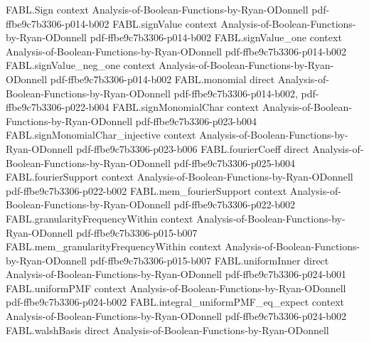 \begin{theorem}
\label{FABL.FiniteFourierBasis.productFunction_dependsOnly_support}
\leanok
{}
\proofstep
  {FABL.Sign}
  {context}
  {Analysis-of-Boolean-Functions-by-Ryan-ODonnell}
  {pdf-ffbe9c7b3306-p014-b002}
\proofstep
  {FABL.signValue}
  {context}
  {Analysis-of-Boolean-Functions-by-Ryan-ODonnell}
  {pdf-ffbe9c7b3306-p014-b002}
\proofstep
  {FABL.signValue_one}
  {context}
  {Analysis-of-Boolean-Functions-by-Ryan-ODonnell}
  {pdf-ffbe9c7b3306-p014-b002}
\proofstep
  {FABL.signValue_neg_one}
  {context}
  {Analysis-of-Boolean-Functions-by-Ryan-ODonnell}
  {pdf-ffbe9c7b3306-p014-b002}
\proofstep
  {FABL.monomial}
  {direct}
  {Analysis-of-Boolean-Functions-by-Ryan-ODonnell}
  {pdf-ffbe9c7b3306-p014-b002,
    pdf-ffbe9c7b3306-p022-b004}
\proofstep
  {FABL.signMonomialChar}
  {context}
  {Analysis-of-Boolean-Functions-by-Ryan-ODonnell}
  {pdf-ffbe9c7b3306-p023-b004}
\proofstep
  {FABL.signMonomialChar_injective}
  {context}
  {Analysis-of-Boolean-Functions-by-Ryan-ODonnell}
  {pdf-ffbe9c7b3306-p023-b006}
\proofstep
  {FABL.fourierCoeff}
  {direct}
  {Analysis-of-Boolean-Functions-by-Ryan-ODonnell}
  {pdf-ffbe9c7b3306-p025-b004}
\proofstep
  {FABL.fourierSupport}
  {context}
  {Analysis-of-Boolean-Functions-by-Ryan-ODonnell}
  {pdf-ffbe9c7b3306-p022-b002}
\proofstep
  {FABL.mem_fourierSupport}
  {context}
  {Analysis-of-Boolean-Functions-by-Ryan-ODonnell}
  {pdf-ffbe9c7b3306-p022-b002}
\proofstep
  {FABL.granularityFrequencyWithin}
  {context}
  {Analysis-of-Boolean-Functions-by-Ryan-ODonnell}
  {pdf-ffbe9c7b3306-p015-b007}
\proofstep
  {FABL.mem_granularityFrequencyWithin}
  {context}
  {Analysis-of-Boolean-Functions-by-Ryan-ODonnell}
  {pdf-ffbe9c7b3306-p015-b007}
\proofstep
  {FABL.uniformInner}
  {direct}
  {Analysis-of-Boolean-Functions-by-Ryan-ODonnell}
  {pdf-ffbe9c7b3306-p024-b001}
\proofstep
  {FABL.uniformPMF}
  {context}
  {Analysis-of-Boolean-Functions-by-Ryan-ODonnell}
  {pdf-ffbe9c7b3306-p024-b002}
\proofstep
  {FABL.integral_uniformPMF_eq_expect}
  {context}
  {Analysis-of-Boolean-Functions-by-Ryan-ODonnell}
  {pdf-ffbe9c7b3306-p024-b002}
\proofstep
  {FABL.walshBasis}
  {direct}
  {Analysis-of-Boolean-Functions-by-Ryan-ODonnell}

\end{theorem}
